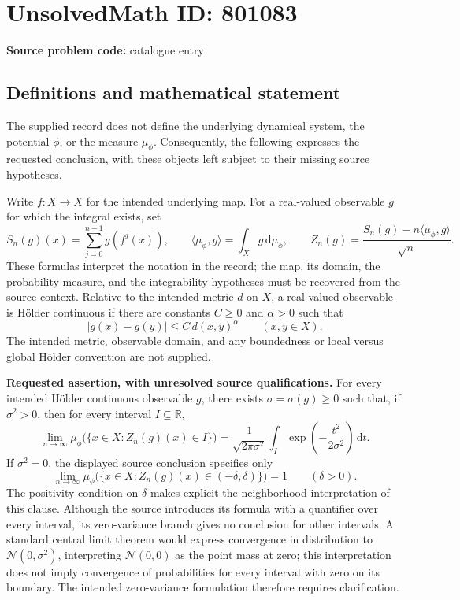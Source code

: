 \documentclass[11pt]{article}
\newcommand{\R}{\mathbb{R}}
\begin{document}
\section*{UnsolvedMath ID: 801083}
\textbf{Source problem code:} catalogue entry
\subsection{Definitions and mathematical statement}
The supplied record does not define the underlying dynamical system, the potential $\phi$, or the measure $\mu_\phi$. Consequently, the following expresses the requested conclusion, with these objects left subject to their missing source hypotheses.

Write $f\colon X\to X$ for the intended underlying map. For a real-valued observable $g$ for which the integral exists, set
\[
S_n(g)(x)=\sum_{j=0}^{n-1}g(f^j(x)),\qquad
\langle\mu_\phi,g\rangle=\int_X g\,\mathrm d\mu_\phi,
\qquad
Z_n(g)=\frac{S_n(g)-n\langle\mu_\phi,g\rangle}{\sqrt n}.
\]
These formulas interpret the notation in the record; the map, its domain, the probability measure, and the integrability hypotheses must be recovered from the source context. Relative to the intended metric $d$ on $X$, a real-valued observable is H\"older continuous if there are constants $C\geq0$ and $\alpha>0$ such that
\[
|g(x)-g(y)|\leq C\,d(x,y)^\alpha\qquad(x,y\in X).
\]
The intended metric, observable domain, and any boundedness or local versus global H\"older convention are not supplied.

\textbf{Requested assertion, with unresolved source qualifications.} For every intended H\"older continuous observable $g$, there exists $\sigma=\sigma(g)\geq0$ such that, if $\sigma^2>0$, then for every interval $I\subseteq\R$,
\[
\lim_{n\to\infty}\mu_\phi\bigl(\{x\in X:Z_n(g)(x)\in I\}\bigr)
=\frac{1}{\sqrt{2\pi\sigma^2}}\int_I
\exp\!\left(-\frac{t^2}{2\sigma^2}\right)\,\mathrm dt.
\]
If $\sigma^2=0$, the displayed source conclusion specifies only
\[
\lim_{n\to\infty}\mu_\phi\bigl(\{x\in X:Z_n(g)(x)\in(-\delta,\delta)\}\bigr)=1
\qquad(\delta>0).
\]
The positivity condition on $\delta$ makes explicit the neighborhood interpretation of this clause. Although the source introduces its formula with a quantifier over every interval, its zero-variance branch gives no conclusion for other intervals. A standard central limit theorem would express convergence in distribution to $\mathcal N(0,\sigma^2)$, interpreting $\mathcal N(0,0)$ as the point mass at zero; this interpretation does not imply convergence of probabilities for every interval with zero on its boundary. The intended zero-variance formulation therefore requires clarification.
\end{document}
